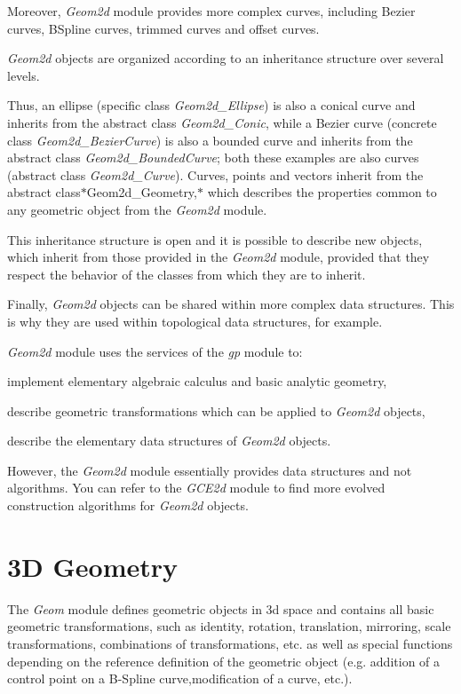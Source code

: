 Moreover, {\itshape Geom2d} module provides more complex curves, including Bezier curves, B\+Spline curves, trimmed curves and offset curves.

{\itshape Geom2d} objects are organized according to an inheritance structure over several levels.

Thus, an ellipse (specific class {\itshape Geom2d\+\_\+\+Ellipse}) is also a conical curve and inherits from the abstract class {\itshape Geom2d\+\_\+\+Conic}, while a Bezier curve (concrete class {\itshape Geom2d\+\_\+\+Bezier\+Curve}) is also a bounded curve and inherits from the abstract class {\itshape Geom2d\+\_\+\+Bounded\+Curve}; both these examples are also curves (abstract class {\itshape Geom2d\+\_\+\+Curve}). Curves, points and vectors inherit from the abstract class$\ast$\+Geom2d\+\_\+\+Geometry,$\ast$ which describes the properties common to any geometric object from the {\itshape Geom2d} module.

This inheritance structure is open and it is possible to describe new objects, which inherit from those provided in the {\itshape Geom2d} module, provided that they respect the behavior of the classes from which they are to inherit.

Finally, {\itshape Geom2d} objects can be shared within more complex data structures. This is why they are used within topological data structures, for example.

{\itshape Geom2d} module uses the services of the {\itshape gp} module to\+:
\begin{DoxyItemize}
\item implement elementary algebraic calculus and basic analytic geometry,
\item describe geometric transformations which can be applied to {\itshape Geom2d} objects,
\item describe the elementary data structures of {\itshape Geom2d} objects.
\end{DoxyItemize}

However, the {\itshape Geom2d} module essentially provides data structures and not algorithms. You can refer to the {\itshape G\+C\+E2d} module to find more evolved construction algorithms for {\itshape Geom2d} objects.\hypertarget{occt_user_guides__modeling_data_occt_modat_3}{}\section{3\+D Geometry}\label{occt_user_guides__modeling_data_occt_modat_3}
The {\itshape Geom} module defines geometric objects in 3d space and contains all basic geometric transformations, such as identity, rotation, translation, mirroring, scale transformations, combinations of transformations, etc. as well as special functions depending on the reference definition of the geometric object (e.\+g. addition of a control point on a B-\/\+Spline curve,modification of a curve, etc.).


